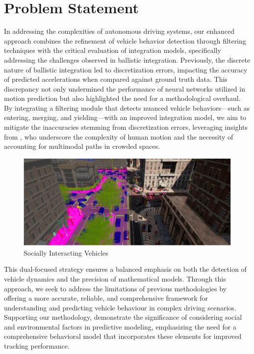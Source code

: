 \section{Problem Statement}

In addressing the complexities of autonomous driving systems, our enhanced approach combines the refinement of vehicle behavior detection through filtering techniques with the critical evaluation of integration models, specifically addressing the challenges observed in ballistic integration. Previously, the discrete nature of ballistic integration led to discretization errors, impacting the accuracy of predicted accelerations when compared against ground truth data. This discrepancy not only undermined the performance of neural networks utilized in motion prediction but also highlighted the need for a methodological overhaul. By integrating a filtering module that detects nuanced vehicle behaviors—such as entering, merging, and yielding—with an improved integration model, we aim to mitigate the inaccuracies stemming from discretization errors, leveraging insights from \cite{gupta2018social}, who underscore the complexity of human motion and the necessity of accounting for multimodal paths in crowded spaces. 
\begin{figure}[h]
\centering
\includegraphics[width=\columnwidth]{./images/figures/intro.jpeg}
\caption{Socially Interacting Vehicles}
\label{fig:intro}
\end{figure}
This dual-focused strategy ensures a balanced emphasis on both the detection of vehicle dynamics and the precision of mathematical models. Through this approach, we seek to address the limitations of previous methodologies by offering a more accurate, reliable, and comprehensive framework for understanding and predicting vehicle behaviour in complex driving scenarios. Supporting our methodology, \cite{5995468} demonstrate the significance of considering social and environmental factors in predictive modeling, emphasizing the need for a comprehensive behavioral model that incorporates these elements for improved tracking performance.

